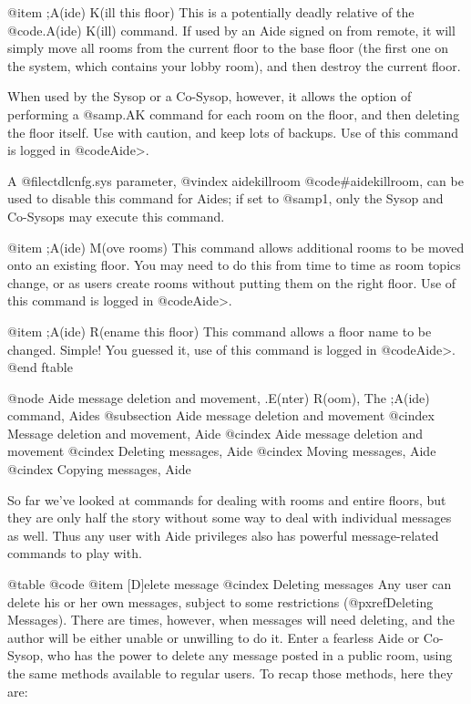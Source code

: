 @item ;A(ide) K(ill this floor)
This is a potentially deadly relative of the @code{.A(ide) K(ill)}
command.  If used by an Aide signed on from remote, it
will simply move all rooms from the current floor to the base
floor (the first one on the system, which contains your lobby
room), and then destroy the current floor.

When used by the Sysop or a Co-Sysop, however, it allows the option
of performing a @samp{.AK} command for each room on the floor, and
then deleting the floor itself.  Use with caution, and keep
lots of backups.  Use of this command is logged in @code{Aide>}.

A @file{ctdlcnfg.sys} parameter,
@vindex aidekillroom
@code{#aidekillroom}, can be used
to disable this command for Aides; if set to @samp{1},
only the Sysop and Co-Sysops may execute this command.

@item ;A(ide) M(ove rooms)
This command allows additional rooms to be moved onto
an existing floor.  You may need to do this from time to time
as room topics change, or as users create rooms without
putting them on the right floor.  Use of this command is
logged in @code{Aide>}.

@item ;A(ide) R(ename this floor)
This command allows a floor name to be changed.
Simple!  You guessed it, use of this command is logged in
@code{Aide>}.
@end ftable

@node Aide message deletion and movement, .E(nter) R(oom), The ;A(ide) command, Aides
@subsection Aide message deletion and movement
@cindex Message deletion and movement, Aide
@cindex Aide message deletion and movement
@cindex Deleting messages, Aide
@cindex Moving messages, Aide
@cindex Copying messages, Aide

So far we've looked at commands for dealing with rooms and
entire floors, but they are only half the story without some way to
deal with individual messages as well.  Thus any user with Aide
privileges also has powerful message-related commands to play with.

@table @code
@item [D]elete message
@cindex Deleting messages
Any user can delete his or her own messages, subject
to some restrictions (@pxref{Deleting Messages}).
There are times,
however, when messages will need deleting, and the author
will be either unable or unwilling to do it.  Enter a fearless
Aide or Co-Sysop, who has the power to delete any message posted in a
public room, using the same methods available to regular users.
To recap those methods, here they are:

